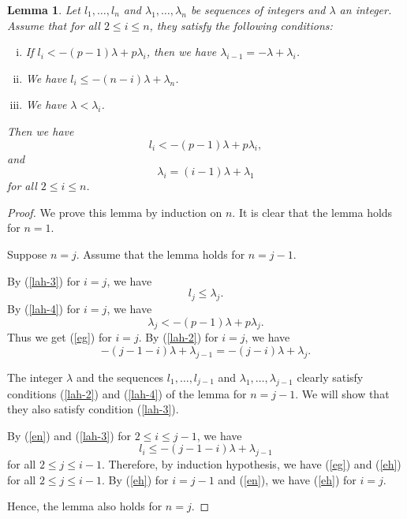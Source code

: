 \documentclass[sn-mathphys-num]{sn-jnl}
\numberwithin{equation}{section}
\theoremstyle{plain}
\newtheorem{lemm}[theo]{Lemma}
\theoremstyle{definition}
\begin{document}
  \begin{lemm}\label{lah}
  Let $l_1,\ldots,l_n$ and $\lambda_1,\ldots,\lambda_n$ be sequences of integers and $\lambda$ an integer. Assume that for all $2\leq i\leq n$, they satisfy the following conditions:
  \begin{enumerate}[(i)]
  \item\label{lah-2} If $l_i<-(p-1)\lambda+p\lambda_i$, then we have $\lambda_{i-1}=-\lambda+\lambda_i$.
  \item\label{lah-3} We have $l_i\leq -(n-i)\lambda+\lambda_n$.
  \item\label{lah-4} We have $\lambda<\lambda_i$.
  \end{enumerate}

  Then we have
  \begin{equation}\label{eg}
    l_i<-(p-1)\lambda+p\lambda_i,
  \end{equation}
   and
  \begin{equation}\label{eh}
    \lambda_i=(i-1)\lambda+\lambda_1
  \end{equation}
  for all $2\leq i\leq n$.
\end{lemm}

\begin{proof}
  We prove this lemma by induction on $n$. It is clear that the lemma holds for $n=1$.

  Suppose $n=j$. Assume that the lemma holds for $n=j-1$.
  
  By (\ref{lah-3}) for $i=j$, we have
  \begin{equation}
  l_j\leq \lambda_j.
  \end{equation}
  By (\ref{lah-4}) for $i=j$, we have
  \begin{equation}
  \lambda_j<-(p-1)\lambda+p\lambda_j.
  \end{equation}
  Thus we get (\ref{eg}) for $i=j$.
  By (\ref{lah-2}) for $i=j$, we have
  \begin{equation}\label{en}
  -(j-1-i)\lambda+\lambda_{j-1}=-(j-i)\lambda+\lambda_j.
  \end{equation}

  The integer $\lambda$ and the sequences $l_1,\ldots,l_{j-1}$ and $\lambda_1,\ldots,\lambda_{j-1}$ clearly satisfy conditions (\ref{lah-2}) and (\ref{lah-4}) of the lemma for $n=j-1$. We will show that they also satisfy condition (\ref{lah-3}).

  By (\ref{en}) and (\ref{lah-3}) for $2\leq i\leq j-1$, we have
  \begin{equation}
  l_i\leq-(j-1-i)\lambda+\lambda_{j-1}
  \end{equation}
  for all $2\leq j\leq i-1$. Therefore, by induction hypothesis, we have (\ref{eg}) and (\ref{eh}) for all $2\leq j\leq i-1$. By (\ref{eh}) for $i=j-1$ and (\ref{en}), we have (\ref{eh}) for $i=j$.

  Hence, the lemma also holds for $n=j$.
\end{proof}
\end{document}
